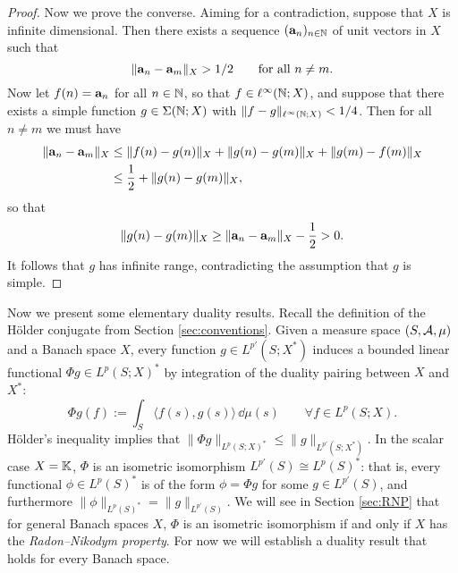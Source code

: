 \begin{proof}
  Now we prove the converse.
  Aiming for a contradiction, suppose that $X$ is infinite dimensional.
  Then there exists a sequence $(\mathbf{a}_n)_{n \in \mathbb{N}}$ of unit vectors in $X$ such that
  \begin{equation*}
    \|\mathbf{a}_n - \mathbf{a}_m\|_X > 1/2 \qquad \text{for all $n \neq m$.}
  \end{equation*}
  Now let $f(n) = \mathbf{a}_n$ for all $n \in \mathbb{N}$, so that $f \in \ell^\infty(\mathbb{N};X)$, and suppose that there exists a simple function $g \in \Sigma(\mathbb{N};X)$ with $\|f - g\|_{\ell^\infty(\mathbb{N};X)} < 1/4$.
  Then for all $n \neq m$ we must have
  \begin{equation*}
    \begin{aligned}
      \|\mathbf{a}_n - \mathbf{a}_m\|_X &\leq \|f(n) - g(n)\|_X + \|g(n) - g(m)\|_X + \|g(m) - f(m)\|_X \\
      &\leq \frac{1}{2} + \|g(n) - g(m)\|_X,
    \end{aligned}
  \end{equation*}
  so that
  \begin{equation*}
    \|g(n) - g(m)\|_X \geq \|\mathbf{a}_n - \mathbf{a}_m\|_X - \frac{1}{2} > 0.
  \end{equation*}
  It follows that $g$ has infinite range, contradicting the assumption that $g$ is simple.
\end{proof}

Now we present some elementary duality results.
Recall the definition of the H\"older conjugate from Section \ref{sec:conventions}.
Given a measure space $(S,\mathcal{A},\mu)$ and a Banach space $X$, every function $g \in L^{p'}(S;X^*)$ induces a bounded linear functional $\Phi g \in L^p(S;X)^*$ by integration of the duality pairing between $X$ and $X^*$:
\begin{equation*}
  \Phi g(f) := \int_S \langle f(s), g(s) \rangle \, \dd\mu(s) \qquad \forall f \in L^p(S;X).
\end{equation*}
H\"older's inequality implies that $\|\Phi g\|_{L^p(S;X)^*} \leq \|g\|_{L^{p'}(S;X^*)}$.
In the scalar case $X = \mathbb{K}$, $\Phi$ is an isometric isomorphism $L^{p'}(S) \cong L^p(S)^*$: that is, every functional $\phi \in L^p(S)^*$ is of the form $\phi = \Phi g$ for some $g \in L^{p'}(S)$, and furthermore $\|\phi\|_{L^p(S)^*} = \|g\|_{L^{p'}(S)}$.
We will see in Section \ref{sec:RNP} that for general Banach spaces $X$, $\Phi$ is an isometric isomorphism if and only if $X$ has the \emph{Radon--Nikodym property}.
For now we will establish a duality result that holds for every Banach space.

